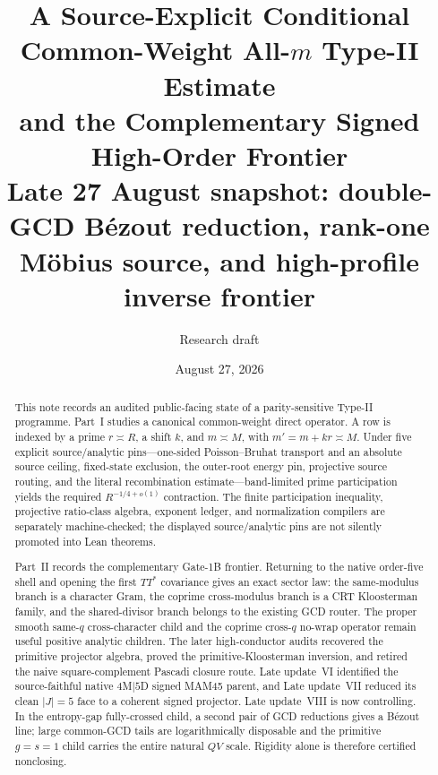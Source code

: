 \documentclass[11pt]{article}
\title{\textbf{A Source-Explicit Conditional Common-Weight All-$m$ Type-II Estimate\\
and the Complementary Signed High-Order Frontier}\\
\large Late 27 August snapshot: double-GCD B\'ezout reduction, rank-one M\"obius source, and high-profile inverse frontier}
\author{Research draft}
\date{August 27, 2026}
\theoremstyle{definition}
\newcommand{\1}{\mathbf 1}
\begin{document}
\maketitle

\begin{abstract}
This note records an audited public-facing state of a parity-sensitive Type-II
programme.  Part~I studies a canonical common-weight direct operator.  A row
is indexed by a prime $r\asymp R$, a shift $k$, and $m\asymp M$, with
$m'=m+kr\asymp M$.  Under five explicit source/analytic pins---one-sided
Poisson--Bruhat transport and an absolute source ceiling, fixed-state
exclusion, the outer-root energy pin, projective source routing, and the
literal recombination estimate---band-limited prime participation yields the
required $R^{-1/4+o(1)}$ contraction.  The finite participation inequality,
projective ratio-class algebra, exponent ledger, and normalization compilers
are separately machine-checked; the displayed source/analytic pins are not
silently promoted into Lean theorems.

Part~II records the complementary Gate-1B frontier.  Returning to the
native order-five shell and opening the first $TT^\ast$ covariance gives an
exact sector law: the same-modulus branch is a character Gram, the coprime
cross-modulus branch is a CRT Kloosterman family, and the shared-divisor branch
belongs to the existing GCD router.  The proper smooth same-$q$ cross-character
child and the coprime cross-$q$ no-wrap operator remain useful positive
analytic children.  The later high-conductor audits recovered the primitive
projector algebra, proved the primitive-Kloosterman inversion, and retired the
naive square-complement Pascadi closure route.  Late update~VI identified the
source-faithful native $4$M$\mid5$D signed MAM45 parent, and Late update~VII
reduced its clean $|J|=5$ face to a coherent signed projector.  Late
update~VIII is now controlling.  In the entropy-gap fully-crossed child, a
second pair of GCD reductions gives a B\'ezout line; large common-GCD tails are
logarithmically disposable and the primitive $g=s=1$ child carries the entire
natural $QV$ scale.  Rigidity alone is therefore certified nonclosing.


\end{abstract}
\end{document}
